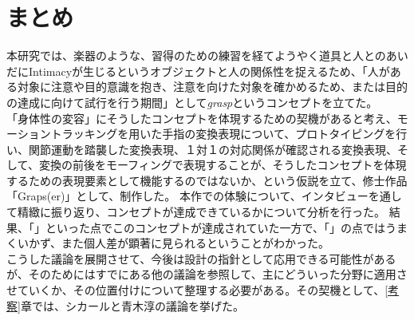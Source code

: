 \chapter{まとめ}
本研究では、楽器のような、習得のための練習を経てようやく道具と人とのあいだにIntimacyが生じるというオブジェクトと人の関係性を捉えるため、「人がある対象に注意や目的意識を抱き、注意を向けた対象を確かめるため、または目的の達成に向けて試行を行う期間」として\textit{grasp}というコンセプトを立てた。\\
「身体性の変容」にそうしたコンセプトを体現するための契機があると考え、モーショントラッキングを用いた手指の変換表現について、プロトタイピングを行い、関節運動を踏襲した変換表現、１対１の対応関係が確認される変換表現、そして、変換の前後をモーフィングで表現することが、そうしたコンセプトを体現するための表現要素として機能するのではないか、という仮説を立て、修士作品「Graps(er)」として、制作した。
本作での体験について、インタビューを通して精緻に振り返り、コンセプトが達成できているかについて分析を行った。
結果、「」といった点でこのコンセプトが達成されていた一方で、「」の点ではうまくいかず、また個人差が顕著に見られるということがわかった。\\

こうした議論を展開させて、今後は設計の指針として応用できる可能性があるが、そのためにはすでにある他の議論を参照して、主にどういった分野に適用させていくか、その位置付けについて整理する必要がある。その契機として、\ref{考察}章では、シカールと青木淳の議論を挙げた。
